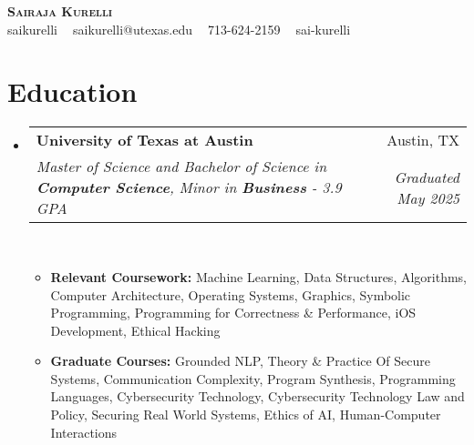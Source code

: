 \documentclass[letterpaper,11pt]{article}
\makeatletter
\newcommand{\resumeItem}[1]{
  \item\small{
    {#1 \vspace{-2pt}}
  }
}
\newcommand{\resumeSubLineheading}[6]{
  \vspace{-2pt}\item
    \begin{tabular*}{0.97\textwidth}[t]{l@{\extracolsep{\fill}}r}
      \textbf{#1} & #2 \\
      \textit{\small#3} & \textit{\small #5} \\
    \end{tabular*}\vspace{-7pt}
}
\newcommand{\resumeSubHeadingListStart}{\begin{itemize}[leftmargin=0.15in, label={}]}
\newcommand{\resumeSubHeadingListEnd}{\end{itemize}}
\newcommand{\resumeItemListStart}{\begin{itemize}}
\newcommand{\resumeItemListEnd}{\end{itemize}\vspace{-5pt}}
\makeatother
\begin{document}

\begin{center}
	\textbf{\huge \scshape Sairaja Kurelli} \\ \vspace{3pt}
	\small \faGithub{} saikurelli $\;\;$ \faEnvelope{} saikurelli@utexas.edu $\;\;$ \faPhone{} 713-624-2159 $\;\;$\faLinkedin{} sai-kurelli
\end{center}


\section{Education}
\resumeSubHeadingListStart
\resumeSubLineheading
{University of Texas at Austin}{Austin, TX}
{Master of Science and Bachelor of Science in \textbf{Computer Science}, Minor in \textbf{Business} - 3.9 GPA}
{}{Graduated May 2025} {}
\\
\resumeItemListStart
\resumeItem{\small \textbf{Relevant Coursework:} Machine Learning, Data Structures, Algorithms,
	Computer Architecture, Operating Systems, Graphics, Symbolic Programming, Programming for Correctness \& Performance,
	iOS Development, Ethical Hacking} %
\resumeItem{\small \textbf{Graduate Courses:} Grounded NLP, Theory \& Practice Of Secure Systems, Communication Complexity, Program Synthesis, Programming Languages, Cybersecurity Technology, Cybersecurity Technology Law and Policy, Securing Real World Systems, Ethics of AI, Human-Computer Interactions}
\resumeItemListEnd
\resumeSubHeadingListEnd
\end{document}
